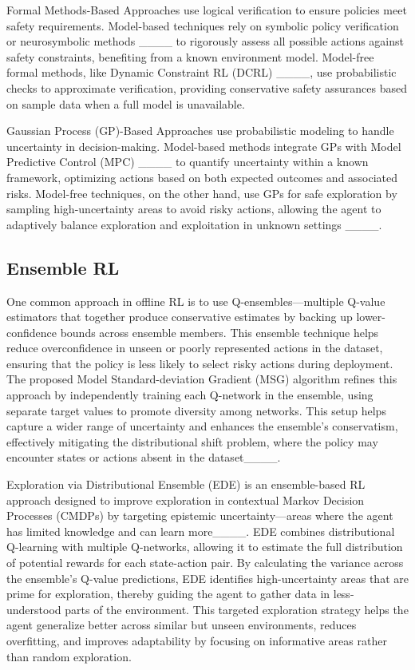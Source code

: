 Formal Methods-Based Approaches  use logical verification to ensure policies meet safety requirements. Model-based techniques rely on symbolic policy verification or neurosymbolic methods ____ to rigorously assess all possible actions against safety constraints, benefiting from a known environment model. Model-free formal methods, like Dynamic Constraint RL (DCRL) ____, use probabilistic checks to approximate verification, providing conservative safety assurances based on sample data when a full model is unavailable.

Gaussian Process (GP)-Based Approaches use probabilistic modeling to handle uncertainty in decision-making. Model-based methods integrate GPs with Model Predictive Control (MPC) ____ to quantify uncertainty within a known framework, optimizing actions based on both expected outcomes and associated risks. Model-free techniques, on the other hand, use GPs for safe exploration by sampling high-uncertainty areas to avoid risky actions, allowing the agent to adaptively balance exploration and exploitation in unknown settings ____.


\subsection{Ensemble RL}
One common approach in offline RL is to use Q-ensembles—multiple Q-value estimators that together produce conservative estimates by backing up lower-confidence bounds across ensemble members. This ensemble technique helps reduce overconfidence in unseen or poorly represented actions in the dataset, ensuring that the policy is less likely to select risky actions during deployment. The proposed Model Standard-deviation Gradient (MSG) algorithm refines this approach by independently training each Q-network in the ensemble, using separate target values to promote diversity among networks. This setup helps capture a wider range of uncertainty and enhances the ensemble's conservatism, effectively mitigating the distributional shift problem, where the policy may encounter states or actions absent in the dataset____.

Exploration via Distributional Ensemble (EDE) is an ensemble-based RL approach designed to improve exploration in contextual Markov Decision Processes (CMDPs) by targeting epistemic uncertainty—areas where the agent has limited knowledge and can learn more____. EDE combines distributional Q-learning with multiple Q-networks, allowing it to estimate the full distribution of potential rewards for each state-action pair. By calculating the variance across the ensemble's Q-value predictions, EDE identifies high-uncertainty areas that are prime for exploration, thereby guiding the agent to gather data in less-understood parts of the environment. This targeted exploration strategy helps the agent generalize better across similar but unseen environments, reduces overfitting, and improves adaptability by focusing on informative areas rather than random exploration.



